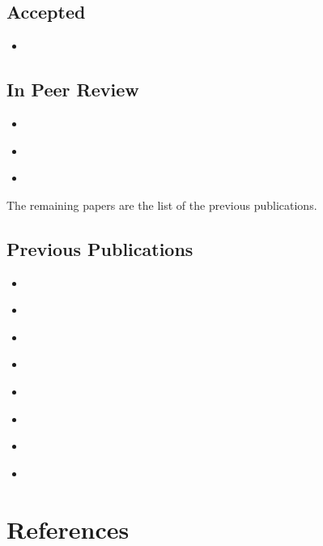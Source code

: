\documentclass[11pt]{article}
\begin{document}
\subsection{Accepted}\label{subsec:accepted}

\begin{itemize}
	\item {}~\cite{DBLP:conf/aequitas/Magnini24}
\end{itemize}

\subsection{In Peer Review}\label{subsec:in-peer-review}

\begin{itemize}
	\item {}~\cite{DBLP:journals/kbs/CiattoKB24}
	\item {}~\cite{DBLP:conf/percom/MontagnaAFPKUM24}
	\item {}~\cite{DBLP:conf/hc/Magnini24}
\end{itemize}

The remaining papers are the list of the previous publications.
%
\subsection{Previous Publications}\label{subsec:previous-publications}

\begin{itemize}
	\item {}~\cite{DBLP:journals/aamas/AgiolloRMCO23}
	\item {}~\cite{DBLP:journals/cmpb/MagniniCCAO23}
	\item {}~\cite{DBLP:journals/logcom/MagniniCO23}
	\item {}~\cite{DBLP:conf/woa/MagniniCO22}
	\item {}~\cite{DBLP:conf/aiia/MagniniCO22}
	\item {}~\cite{DBLP:conf/cilc/MagniniCO22}
	\item {}~\cite{DBLP:conf/atal/MagniniCO22}
	\item {}~\cite{DBLP:conf/extraamas/CiattoMBAO23}
\end{itemize}

\section{References}\label{sec:references}
\printbibliography[heading=none]
\end{document}
